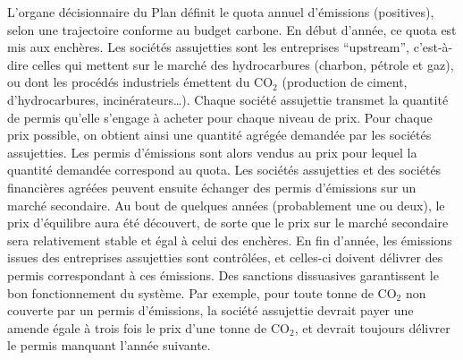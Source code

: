 \documentclass[a5paper,french]{memoir}
\begin{document}
L'organe décisionnaire du Plan définit le quota annuel d'émissions (positives), selon une trajectoire conforme au budget carbone. En début d'année, ce quota est mis aux enchères. %
Les sociétés assujetties sont les entreprises ``upstream'', c'est-à-dire celles qui mettent sur le marché des hydrocarbures (charbon, pétrole et gaz), ou dont les procédés industriels émettent du CO$_\text{2}$ (production de ciment, d'hydrocarbures, incinérateurs\dots). 
Chaque société assujettie transmet la quantité de permis qu'elle s'engage à acheter pour chaque niveau de prix. Pour chaque prix possible, on obtient ainsi une quantité agrégée demandée par les sociétés assujetties. Les permis d'émissions sont alors vendus au prix pour lequel la quantité demandée correspond au quota. Les sociétés assujetties et des sociétés financières agréées peuvent ensuite échanger des permis d'émissions sur un marché secondaire. Au bout de quelques années (probablement une ou deux), le prix d'équilibre aura été découvert, de sorte que le prix sur le marché secondaire sera relativement stable et égal à celui des enchères. En fin d'année, les émissions issues des entreprises assujetties sont contrôlées, et celles-ci doivent délivrer des permis correspondant à ces émissions. Des sanctions dissuasives garantissent le bon fonctionnement du système. Par exemple, pour toute tonne de CO$_\text{2}$ non couverte par un permis d'émissions, la société assujettie devrait payer une amende égale à trois fois le prix d'une tonne de CO$_\text{2}$, et devrait toujours délivrer le permis manquant l'année suivante. 
\end{document}
